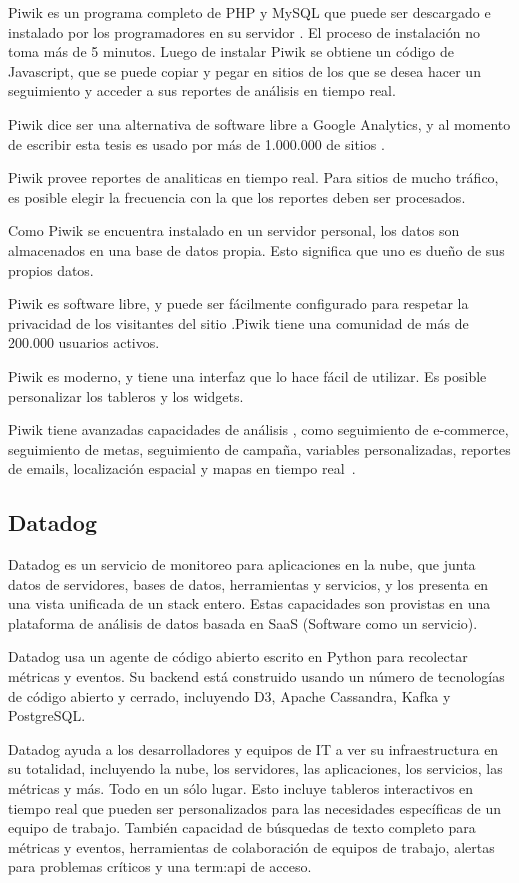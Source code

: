 Piwik es un programa completo de PHP y MySQL que puede ser descargado e
instalado por los programadores en su servidor . El proceso de instalación
no toma más de 5 minutos. Luego de instalar Piwik se obtiene un código de
Javascript, que se puede copiar y pegar en sitios  de los que se desea hacer
un seguimiento y acceder a sus reportes de análisis en tiempo real.

Piwik dice ser una alternativa de software libre a Google Analytics, y al
momento de escribir esta tesis es usado por más de 1.000.000 de sitios .

Piwik provee reportes de analiticas  en tiempo real. Para sitios  de
mucho tráfico, es posible elegir la frecuencia con la que los reportes deben
ser procesados.

Como Piwik se encuentra instalado en un servidor personal, los datos son
almacenados en una base de datos propia. Esto significa que uno es dueño de sus
propios datos.

Piwik es software libre, y puede ser fácilmente configurado para respetar la
privacidad de los visitantes del sitio .Piwik tiene una comunidad de más de
200.000 usuarios activos.

Piwik es moderno, y tiene una interfaz que lo hace fácil de utilizar. Es
posible personalizar los tableros y los widgets.

Piwik tiene avanzadas capacidades de análisis , como seguimiento de
e-commerce, seguimiento de metas, seguimiento de campaña, variables
personalizadas, reportes de emails, localización espacial y mapas en tiempo
real~\cite{piwik}.

\subsection{Datadog}

Datadog es un servicio de monitoreo para aplicaciones en la nube, que junta
datos de servidores, bases de datos, herramientas y servicios, y los presenta
en una vista unificada de un stack entero. Estas capacidades son provistas en
una plataforma de análisis de datos  basada en SaaS (Software como un
servicio).

Datadog usa un agente de código abierto escrito en Python para recolectar
métricas y eventos. Su backend está construido usando un número de tecnologías
de código abierto y cerrado, incluyendo D3, Apache Cassandra, Kafka y
PostgreSQL.

Datadog ayuda a los desarrolladores y equipos de IT a ver su infraestructura en
su totalidad, incluyendo la nube, los servidores, las aplicaciones, los
servicios, las métricas y más. Todo en un sólo lugar. Esto incluye tableros
interactivos en tiempo real que pueden ser personalizados para las necesidades
específicas de un equipo de trabajo. También capacidad de búsquedas de texto
completo para métricas y eventos, herramientas de colaboración de equipos de
trabajo, alertas para problemas críticos y una \gls{term:api} de acceso.

